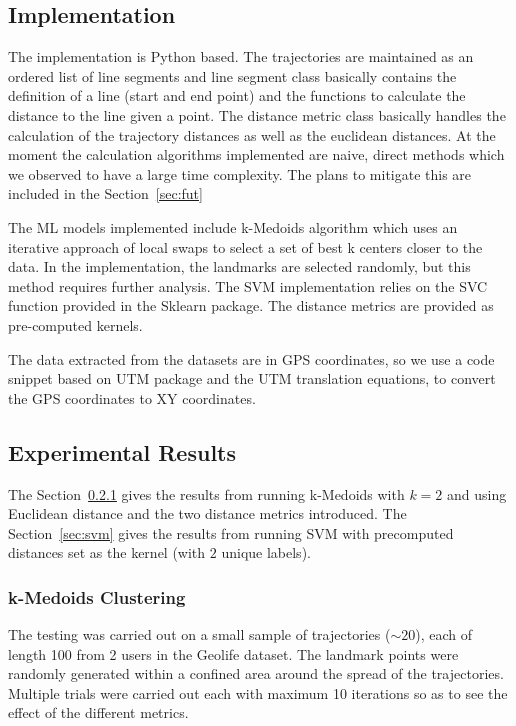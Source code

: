 \documentclass[11pt,a4paper,twocolumn]{article}%
\begin{document}
\subsection{Implementation}\label{sec:impl}

The implementation is Python based. The trajectories are maintained as an ordered list of line segments and line segment class basically contains the definition of a line (start and end point) and the functions to calculate the distance to the line given a point. The distance metric class basically handles the calculation of the trajectory distances as well as the euclidean distances. At the moment the calculation algorithms implemented are naive, direct methods which we observed to have a large time complexity. The plans to mitigate this are included in the Section~\ref{sec:fut}  

The ML models implemented include k-Medoids algorithm which uses an iterative approach of local swaps to select a set of best k centers closer to the data. In the implementation, the landmarks are selected randomly, but this method requires further analysis. The SVM implementation relies on the SVC function provided in the Sklearn package. The distance metrics are provided as pre-computed kernels.   

The data extracted from the datasets are in GPS coordinates, so we use a code snippet based on UTM package and the UTM translation equations, to convert the GPS coordinates to XY coordinates.
\subsection{Experimental Results}\label{sec:res}

The Section~\ref{sec:kmed} gives the results from running k-Medoids with $k=2$ and using Euclidean distance and the two distance metrics introduced. The Section~\ref{sec:svm} gives the results from running SVM with precomputed distances set as the kernel (with $2$ unique labels).  
\subsubsection{k-Medoids Clustering} \label{sec:kmed}

The testing was carried out on a small sample of trajectories ($\sim 20$), each of length 100 from 2 users in the Geolife dataset. The landmark points were randomly generated within a confined area around the spread of the trajectories. Multiple trials were carried out each with maximum 10 iterations so as to see the effect of the different metrics.
\end{document}
